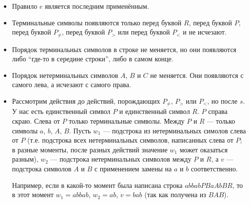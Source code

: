 \documentclass[12pt,a4paper]{article}
\begin{document}
\begin{problem}{5}
\begin{itemize}
            \item Правило $e$ является последним применённым.
            \item Терминальные символы появляются только перед буквой $R$, перед буквой $P$, перед буквой $P_{\neq}$, перед буквой $P_>$ или перед буквой $P_<$ и не исчезают.
            \item Порядок терминальных символов в строке не меняется, но они появляются либо ``где-то в середине строки'', либо в самом конце.
            \item Порядок нетерминальных символов $A$, $B$ и $C$ не меняется. Они появляются с самого лева, а исчезают с самого права.
            \item Рассмотрим действия до действий, порождающих $P_{\neq}$, $P_>$ или $P_<$, но после $s$. У нас есть единственный символ $P$ и единственный символ $R$. $P$ справа скраю. Слева от $P$ только терминальные символы. Между $P$ и $R$ --- только символы $a$, $b$, $A$, $B$. Пусть $w_1$ --- подстрока из нетерминальных симолов слева от $P$ (т.е. подстрока всех нетерминальных символов, написанных слева от $P$; в разные моменты, после разных действий значение $w_1$ может оказаться разным), $w_2$ --- подстрока нетерминальных символов между $P$ и $R$, а $v$ --- подстрока символов $A$ и $B$ с применением замены на $a$ и $b$ соответственно.

                Например, если в какой-то момент была написана строка $abbabPBaAbBR$, то в этот момент $w_1 = abbab$, $w_2 = ab$, $v = bab$ (так как получена из $BAB$).


\end{itemize}
\end{problem}
\end{document}
